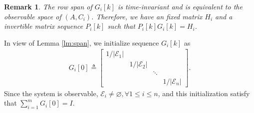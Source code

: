 \documentclass[12pt]{article}
\newcommand{\Ec}{{\mathcal{E}}} %
\newcommand{\I}{{\mathcal{I}}}
\newcommand{\Rc}{{\mathcal{R}}}
\newcommand{\Sc}{{\mathcal{S}}}
\newcommand{\rs}{\text{rowspan}}
\newtheorem{remark}{\textbf{Remark}}
\newtheorem{corollary}{\textbf{Corollary}}
\newtheorem*{proof}{\textbf{Proof}}
\begin{document}
\begin{remark}
	The row span of $G_i[k]$ is time-invariant and is equivalent to the observable space of $(A,C_i)$. Therefore, we have an fixed matrix $H_i$ and a invertible matrix sequence $P_i[k]$ such that $P_i[k] G_i[k]=H_i$. 
\end{remark}

In view of Lemma \ref{lm:span}, we initialize sequence $G_i[k]$ as 
\begin{align}\label{eq:init_G}
G_i[0]\triangleq \begin{bmatrix}
1/|\Ec_1| & & & \\
&1/|\Ec_2| & &  \\
& & \ddots &  \\
& & & 1/|\Ec_n|
\end{bmatrix} .
\end{align}
Since the system is observable, $\Ec_i\neq\varnothing, \forall 1\leq i\leq n$, and this initialization satisfy that $\sum_{i=1}^{m} G_i[0]=I$.

\end{document}
